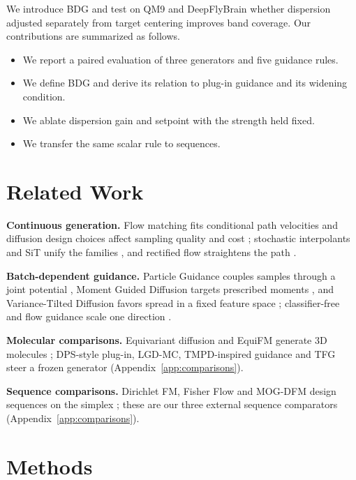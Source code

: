 \documentclass{article}
\begin{document}
We introduce BDG and test on QM9 and DeepFlyBrain whether dispersion adjusted separately from target centering improves band coverage. Our contributions are summarized as follows.
\begin{itemize}
\item We report a paired evaluation of three generators and five guidance rules.
\item We define BDG and derive its relation to plug-in guidance and its widening condition.
\item We ablate dispersion gain and setpoint with the strength held fixed.
\item We transfer the same scalar rule to sequences.
\end{itemize}

\section{Related Work}
\textbf{Continuous generation.} Flow matching fits conditional path velocities \citep{lipman2022flow} and diffusion design choices affect sampling quality and cost \citep{karras2022elucidating}; stochastic interpolants and SiT unify the families \citep{albergo2025stochastic,ma2024sit}, and rectified flow straightens the path \citep{liu2022flow}.

\textbf{Batch-dependent guidance.} Particle Guidance couples samples through a joint potential \citep{corso2024particle}, Moment Guided Diffusion targets prescribed moments \citep{mgd2026moment}, and Variance-Tilted Diffusion favors spread in a fixed feature space \citep{vtd2026variance}; classifier-free and flow guidance scale one direction \citep{ho2022classifier,zheng2023guided}.

\textbf{Molecular comparisons.} Equivariant diffusion and EquiFM generate 3D molecules \citep{hoogeboom2022equivariant,song2023equifm}; DPS-style plug-in, LGD-MC, TMPD-inspired guidance and TFG steer a frozen generator \citep{chung2023dps,song2023lgd,boys2024tmpd,ye2024tfg} (Appendix~\ref{app:comparisons}).

\textbf{Sequence comparisons.} Dirichlet FM, Fisher Flow and MOG-DFM design sequences on the simplex \citep{stark2024dirichlet,davis2024fisher,chen2025multi}; these are our three external sequence comparators (Appendix~\ref{app:comparisons}).

\section{Methods}
\end{document}
